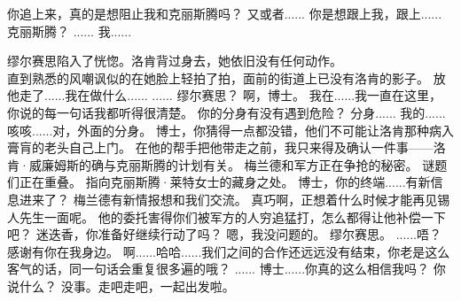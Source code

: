 \documentclass[openany]{book}
\begin{document}
\begin{dialogue}
     你追上来，真的是想阻止我和克丽斯腾吗？
     又或者......
     你是想跟上我，跟上......克丽斯腾？
     ......
     我......\par
    缪尔赛思陷入了恍惚。洛肯背过身去，她依旧没有任何动作。\\
    直到熟悉的风嘲讽似的在她脸上轻拍了拍，面前的街道上已没有洛肯的影子。
     放他走了......我在做什么......
     ......
     缪尔赛思？
     啊，博士。
     我在......我一直在这里，你说的每一句话我都听得很清楚。
     你的分身有没有遇到危险？
     分身......
     我的......咳咳......对，外面的分身。
     博士，你猜得一点都没错，他们不可能让洛肯那种病入膏肓的老头自己上门。
     在他的帮手把他带走之前，我只来得及确认一件事——洛肯·威廉姆斯的确与克丽斯腾的计划有关。
     梅兰德和军方正在争抢的秘密。
     谜题们正在重叠。
     指向克丽斯腾·莱特女士的藏身之处。
     博士，你的终端......有新信息进来了？
     梅兰德有新情报想和我们交流。
     真巧啊，正想着什么时候才能再见锡人先生一面呢。
     他的委托害得你们被军方的人穷追猛打，怎么都得让他补偿一下吧？
     迷迭香，你准备好继续行动了吗？
     嗯，我没问题的。
     缪尔赛思。
     ......唔？
     感谢有你在我身边。
     啊......哈哈......我们之间的合作还远远没有结束，你老是这么客气的话，同一句话会重复很多遍的哦？
     ......
     博士......你真的这么相信我吗？
     你说什么？
     没事。走吧走吧，一起出发啦。
\end{dialogue}
\end{document}
